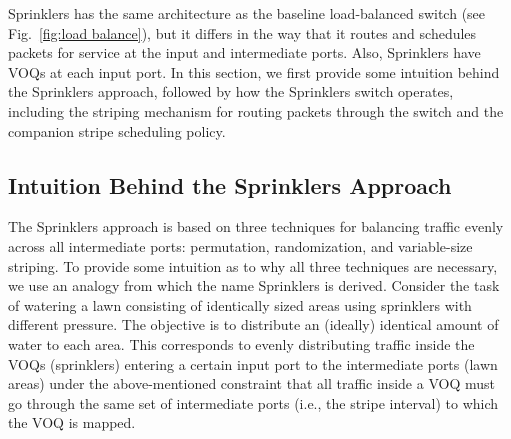 

\begin{comment}
A Sprinklers switch adopts the same 3-stage architecture (shown in Fig.~\ref{fig:load balance}) and 
executes the same periodic sequences of connections in the two switching fabrics,
as a baseline load-balanced switch.   It is different from a baseline load-balanced switch only in the way it routes
and schedules packets for service
at the input and the intermediate ports.  
\end{comment}

\begin{comment}
A Sprinklers switch adopts the same baseline load-balanced switch architecture
(as shown in Fig.~\ref{fig:load balance}) with two fixed switching stages, but
differs in the way that it routes and schedules packets for service at the input
and intermediate ports.
In this section, we first provide some intuition behind the Sprinklers approach.
We then describe how the Sprinklers switch operates,
including the striping mechanism for routing packets through the switch
and the companion stripe scheduling policy.
Then we explain how they enable a Sprinklers switch to eliminate
the packet reordering
problem without paying a hefty price in performance or 
implementation cost.  
\end{comment}

Sprinklers has the same architecture as the baseline load-balanced switch
(see Fig.~\ref{fig:load balance}), but it differs in the way that
it routes and schedules packets for service at the input
and intermediate ports. Also, Sprinklers have  VOQs at each input port.
In this section, we first provide some intuition behind the Sprinklers approach,
followed by how the Sprinklers switch operates,
including the striping mechanism for routing packets through the switch
and the companion stripe scheduling policy.


\subsection{Intuition Behind the Sprinklers Approach}

The Sprinklers approach is based on three techniques for balancing traffic evenly across all  intermediate ports:
permutation, randomization, and variable-size striping.
To provide some intuition as to why all three techniques are necessary, we use
an analogy from which the name Sprinklers is derived.
Consider the task of watering a lawn consisting of  identically sized areas using  sprinklers with different pressure.
The objective is to distribute an (ideally) identical amount of water to each area.  This
corresponds to evenly distributing traffic inside the  VOQs (sprinklers) entering a certain input port to the  intermediate
ports (lawn areas)  
under the above-mentioned constraint that all traffic inside a VOQ must go through the same 
set of intermediate ports (i.e., the stripe interval) to which the VOQ is mapped.



